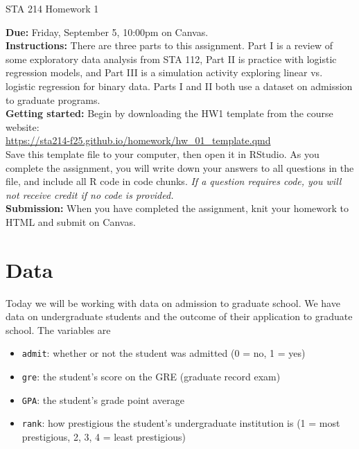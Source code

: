 \documentclass[11pt]{article}
\begin{document}
\begin{center}
\Large
STA 214 Homework 1\\
\normalsize
\vspace{5mm}
\end{center}

\noindent \textbf{Due:} Friday, September 5, 10:00pm on Canvas.\\ 

\noindent \textbf{Instructions:} There are three parts to this assignment. Part I is a review of some exploratory data analysis from STA 112, Part II is practice with logistic regression models, and Part III is a simulation activity exploring linear vs. logistic regression for binary data. Parts I and II both use a dataset on admission to graduate programs.\\

\noindent \textbf{Getting started:} Begin by downloading the HW1 template from the course website:\\

\url{https://sta214-f25.github.io/homework/hw_01_template.qmd}\\

\noindent Save this template file to your computer, then open it in RStudio. As you complete the assignment, you will write down your answers to all questions in the file, and include all R code in code chunks. \textit{If a question requires code, you will not receive credit if no code is provided.}\\

\noindent \textbf{Submission:} When you have completed the assignment, knit your homework to HTML and submit on Canvas.

\section*{Data}

Today we will be working with data on admission to graduate school. We have data on undergraduate students and the outcome of their application to graduate school. The variables are

\begin{itemize}
\item \texttt{admit}: whether or not the student was admitted (0 = no, 1 = yes)
\item \texttt{gre}: the student's score on the GRE (graduate record exam)
\item \texttt{GPA}: the student's grade point average
\item \texttt{rank}: how prestigious the student's undergraduate institution is (1 = most prestigious, 2, 3, 4 = least prestigious)
\end{itemize}
\end{document}
